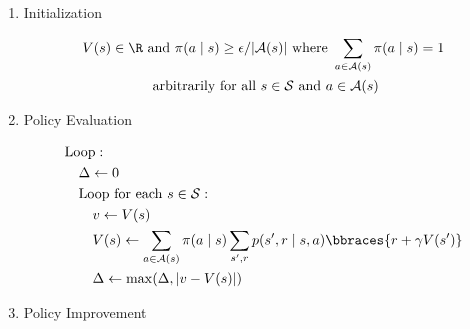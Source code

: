 \begin{solution}

\phantom{}

\begin{tcolorbox}[title = Policy Iteration (using iterative policy evaluation) for estimating $\pi \approx \pi_\ast$]

    \begin{enumerate}[label = \arabic*.]

        \item Initialization

        \begin{multline*}
            V(s) \in \R ~\text{and}~ \pi(a \mid s) \geq \epsilon / |\mathcal A(s)| ~\text{where}~ \sum_{a \in \mathcal A(s)} \pi(a \mid s) = 1 \\
            ~\text{arbitrarily for all}~ s \in \mathcal S ~\text{and}~ a \in \mathcal A(s)
        \end{multline*}

        \item Policy Evaluation
        
        \begin{align*}
            & \text{Loop}: \\
            & \quad \Delta \leftarrow 0 \\
            & \quad \text{Loop for each $s \in \mathcal S$}: \\
            & \quad \quad v \leftarrow V(s) \\
            & \quad \quad V(s) \leftarrow \sum_{a \in \mathcal A(s)} \pi(a \mid s) \sum_{s^\prime, r} p(s^\prime, r \mid s, a) \bbraces{r + \gamma V(s^\prime)} \\
            & \quad \quad \Delta \leftarrow \max(\Delta, |v - V(s)|)
        \end{align*}

        \item Policy Improvement


\end{enumerate}
\end{tcolorbox}
\end{solution}
